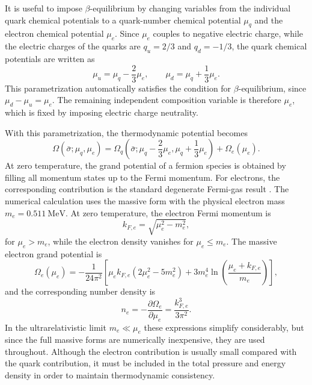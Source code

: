It is useful to impose \(\beta\)-equilibrium by changing variables from
the individual quark chemical potentials to a quark-number chemical
potential \(\mu_q\) and the electron chemical potential \(\mu_e\). Since
\(\mu_e\) couples to negative electric charge, while the electric
charges of the quarks are \(q_u = 2/3\) and \(q_d = -1/3\), the quark
chemical potentials are written as
\begin{equation}
\mu_u = \mu_q - \frac{2}{3}\mu_e,
\qquad
\mu_d = \mu_q + \frac{1}{3}\mu_e.
\label{eq:qs_mu_u_mu_d}
\end{equation}
This parametrization automatically satisfies the condition for
\(\beta\)-equilibrium, since \(\mu_d - \mu_u = \mu_e\). The remaining
independent composition variable is therefore \(\mu_e\), which is
fixed by imposing electric charge neutrality.

With this parametrization, the thermodynamic potential becomes
\begin{equation}
\Omega(\bar{\sigma};\mu_q,\mu_e)
=
\Omega_q\!\left(\bar{\sigma};
\mu_q - \frac{2}{3}\mu_e,
\mu_q + \frac{1}{3}\mu_e
\right)
+
\Omega_e(\mu_e).
\end{equation}
At zero temperature, the grand potential of a fermion species is
obtained by filling all momentum states up to the Fermi momentum. For
electrons, the corresponding contribution is the standard degenerate
Fermi-gas result \cite{shapiro_teukolsky,glendenning2000,Schmitt2010}.
The numerical calculation uses the massive form with the physical
electron mass \(m_e = 0.511~\mathrm{MeV}\). At zero temperature, the
electron Fermi momentum is
\begin{equation}
k_{F,e}
=
\sqrt{\mu_e^2-m_e^2},
\end{equation}
for \(\mu_e>m_e\), while the electron density vanishes for
\(\mu_e\leq m_e\). The massive electron grand potential is
\begin{equation}
\Omega_e(\mu_e)
=
-\frac{1}{24\pi^2}
\left[
\mu_e k_{F,e}\left(2\mu_e^2-5m_e^2\right)
+
3m_e^4
\ln\left(
\frac{\mu_e+k_{F,e}}{m_e}
\right)
\right],
\label{eq:qs_electron_omega_massive}
\end{equation}
and the corresponding number density is
\begin{equation}
n_e
=
-\frac{\partial\Omega_e}{\partial\mu_e}
=
\frac{k_{F,e}^3}{3\pi^2}.
\label{eq:qs_electron_density_massive}
\end{equation}
In the ultrarelativistic limit $m_e \ll \mu_e$ these expressions
simplify considerably, but since the full massive forms are
numerically inexpensive, they are used throughout. Although the
electron contribution is usually small compared with the quark
contribution, it must be included in the total pressure and energy
density in order to maintain thermodynamic consistency.

